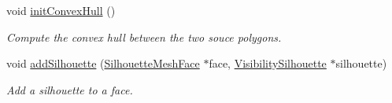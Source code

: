 \begin{DoxyCompactItemize}
\mbox{\label{classvisilib_1_1_silhouette_processor_a75124a633d2221e1fa7218b5eefb09bb}} 
void \mbox{\hyperlink{classvisilib_1_1_silhouette_processor_a75124a633d2221e1fa7218b5eefb09bb}{init\+Convex\+Hull}} ()
\begin{DoxyCompactList}\small\item\em Compute the convex hull between the two souce polygons. \end{DoxyCompactList}\item 
\mbox{\label{classvisilib_1_1_silhouette_processor_a66010aa7b2824edcf3ca0a1704255148}} 
void \mbox{\hyperlink{classvisilib_1_1_silhouette_processor_a66010aa7b2824edcf3ca0a1704255148}{add\+Silhouette}} (\mbox{\hyperlink{classvisilib_1_1_silhouette_mesh_face}{Silhouette\+Mesh\+Face}} $\ast$face, \mbox{\hyperlink{classvisilib_1_1_visibility_silhouette}{Visibility\+Silhouette}} $\ast$silhouette)
\begin{DoxyCompactList}\small\item\em Add a silhouette to a face. \end{DoxyCompactList}\end{DoxyCompactItemize}
